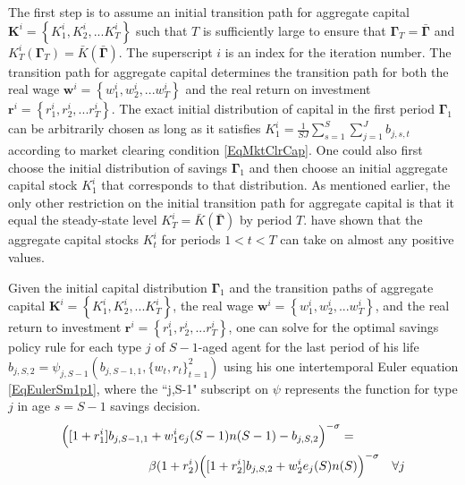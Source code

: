 \documentclass[letterpaper,12pt]{article}
\theoremstyle{definition}
\begin{document}
  The first step is to assume an initial transition path for aggregate capital $\mathbf{K}^i = \left\{K_1^i,K_2^i,...K_T^i\right\}$ such that $T$ is sufficiently large to ensure that $\bm{\Gamma}_T = \bar{\bm{\Gamma}}$ and $K_T^i\left(\bm{\Gamma}_T\right) = \bar{K}\left(\bar{\bm{\Gamma}}\right)$. The superscript $i$ is an index for the iteration number. The transition path for aggregate capital determines the transition path for both the real wage $\bm{w}^i = \left\{w_1^i,w_2^i,...w_T^i\right\}$ and the real return on investment $\bm{r}^i = \left\{r_1^i,r_2^i,...r_T^i\right\}$. The exact initial distribution of capital in the first period $\bm{\Gamma}_1$ can be arbitrarily chosen as long as it satisfies $K_1^i = \frac{1}{SJ}\sum_{s=1}^{S}\sum_{j=1}^{J}b_{j,s,t}$ according to market clearing condition \eqref{EqMktClrCap}. One could also first choose the initial distribution of savings $\bm{\Gamma}_1$ and then choose an initial aggregate capital stock $K_1^i$ that corresponds to that distribution. As mentioned earlier, the only other restriction on the initial transition path for aggregate capital is that it equal the steady-state level $K_T^i = \bar{K}\left(\bar{\bm{\Gamma}}\right)$ by period $T$. \citet{EvansPhillips:2014} have shown that the aggregate capital stocks $K_t^i$ for periods $1<t<T$ can take on almost any positive values.

  Given the initial capital distribution $\bm{\Gamma}_1$ and the transition paths of aggregate capital $\bm{K}^i = \left\{K_1^i,K_2^i,...K_T^i\right\}$, the real wage $\bm{w}^i = \left\{w_1^i,w_2^i,...w_T^i\right\}$, and the real return to investment $\bm{r}^i = \left\{r_1^i,r_2^i,...r_T^i\right\}$, one can solve for the optimal savings policy rule for each type $j$ of $S-1$-aged agent for the last period of his life $b_{j,S,2} = \psi_{j,S-1}(b_{j,S-1,1},\{w_t,r_t\}_{t=1}^2)$ using his one intertemporal Euler equation \eqref{EqEulerSm1p1}, where the ``j,S-1" subscript on $\psi$ represents the function for type $j$ in age $s=S-1$ savings decision.
  \begin{equation}\label{EqEulerSm1p1}
    \begin{split}
      &\Bigl([1+r_1^i]b_{j,S-1,1} + w_1^i e_j(S-1)n(S-1) - b_{j,S,2}\Bigr)^{-\sigma} = \\
      &\quad\quad\quad\quad\quad\quad\quad \beta(1+r_2^i)\Bigl([1+r_2^i]b_{j,S,2} + w_2^i e_j(S)n(S)\Bigr)^{-\sigma} \quad\forall j
    \end{split}
  \end{equation}
\end{document}
